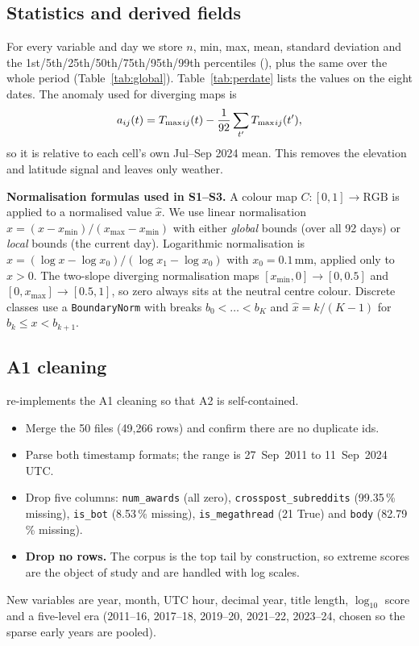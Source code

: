 \subsection{Statistics and derived fields}
For every variable and day we store $n$, min, max, mean, standard deviation and the 1st/5th/25th/50th/75th/95th/99th
percentiles (), plus the same over the whole period (Table~\ref{tab:global}).
Table~\ref{tab:perdate} lists the values on the eight dates. The anomaly used for diverging maps is
\begin{equation}
a_{ij}(t) = T_{\max}{}_{ij}(t) - \frac{1}{92}\sum_{t'}T_{\max}{}_{ij}(t'),
\label{eq:anom}
\end{equation}
so it is relative to each cell's own Jul--Sep 2024 mean. This removes the elevation and latitude signal and leaves only
weather.




\textbf{Normalisation formulas used in S1--S3.} A colour map $C:[0,1]\rightarrow\mathrm{RGB}$ is applied to a normalised
value $\hat{x}$. We use linear normalisation $\hat{x}=(x-x_{\min})/(x_{\max}-x_{\min})$ with either \emph{global} bounds
(over all 92 days) or \emph{local} bounds (the current day). Logarithmic normalisation is
$\hat{x}=(\log x-\log x_0)/(\log x_1-\log x_0)$ with $x_0=0.1$\,mm, applied only to $x>0$. The two-slope diverging
normalisation maps $[x_{\min},0]\rightarrow[0,0.5]$ and $[0,x_{\max}]\rightarrow[0.5,1]$, so zero always sits at the
neutral centre colour. Discrete classes use a \texttt{BoundaryNorm} with breaks $b_0<\dots<b_K$ and
$\hat{x}=k/(K-1)$ for $b_k\le x<b_{k+1}$.

\subsection{A1 cleaning}
\label{sec:a1clean}
 re-implements the A1 cleaning so that A2 is self-contained.
\begin{itemize}
\item Merge the 50 files (49,266 rows) and confirm there are no duplicate ids.
\item Parse both timestamp formats; the range is 27~Sep~2011 to 11~Sep~2024 UTC.
\item Drop five columns: \texttt{num\_awards} (all zero), \texttt{crosspost\_subreddits} (99.35\,\% missing),
  \texttt{is\_bot} (8.53\,\% missing), \texttt{is\_megathread} (21 True) and \texttt{body} (82.79\,\% missing).
\item \textbf{Drop no rows.} The corpus is the top tail by construction, so extreme scores are the object of study and
  are handled with log scales.
\end{itemize}
New variables are year, month, UTC hour, decimal year, title length, $\log_{10}$ score and a five-level era
(2011--16, 2017--18, 2019--20, 2021--22, 2023--24, chosen so the sparse early years are pooled).

